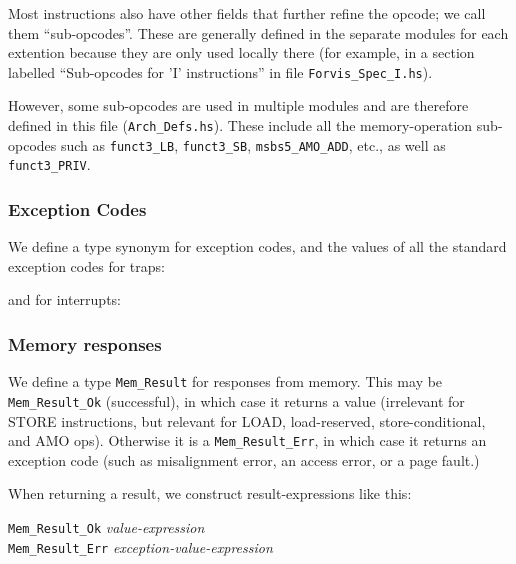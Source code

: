 \documentclass[11pt]{article}
\newcommand{\hm}{\hspace*{1em}}
\newcommand{\hmmm}{\hspace*{3em}}
\begin{document}
Most instructions also have other fields that further refine the
opcode; we call them ``sub-opcodes''.  These are generally defined in
the separate modules for each extention because they are only used
locally there (for example, in a section labelled ``Sub-opcodes for
'I' instructions'' in file \verb|Forvis_Spec_I.hs|).

However, some sub-opcodes are used in multiple modules and are
therefore defined in this file (\verb|Arch_Defs.hs|).  These include
all the memory-operation sub-opcodes such as \verb|funct3_LB|,
\verb|funct3_SB|, \verb|msbs5_AMO_ADD|, etc., as well as
\verb|funct3_PRIV|.


\subsubsection{Exception Codes}

We define a type synonym for exception codes, and the values of all
the standard exception codes for traps:



and for interrupts:




\subsubsection{Memory responses}

\label{sec_mem_responses}

We define a type {\tt Mem\_Result} for responses from memory.  This
may be {\tt Mem\_Result\_Ok} (successful), in which case it returns a
value (irrelevant for STORE instructions, but relevant for LOAD,
load-reserved, store-conditional, and AMO ops).  Otherwise it is a
{\tt Mem\_Result\_Err}, in which case it returns an exception code
(such as misalignment error, an access error, or a page fault.)



When returning a result, we construct result-expressions like this:
\begin{tabbing}
\hmmm \= {\tt Mem\_Result\_Ok} \hm \= \emph{value-expression} \\
      \> {\tt Mem\_Result\_Err}    \> \emph{exception-value-expression}
\end{tabbing}
\end{document}
